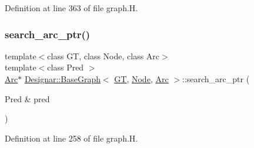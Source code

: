Definition at line 363 of file graph.\+H.

\mbox{\label{class_designar_1_1_base_graph_afcbc602350567bc5a377fd7fc94419ae}} 
\subsubsection{\texorpdfstring{search\+\_\+arc\+\_\+ptr()}{search\_arc\_ptr()}\hspace{0.1cm}{\footnotesize\ttfamily [1/2]}}
{\footnotesize\ttfamily template$<$class GT, class Node, class Arc$>$ \\
template$<$class Pred $>$ \\
\hyperlink{namespace_designar_a3f55fb5513d62ff47cbc8f72b8e95d6f}{Arc}$\ast$ \hyperlink{class_designar_1_1_base_graph}{Designar\+::\+Base\+Graph}$<$ \hyperlink{demo-buildgraph_8_c_a3001c40d2c31ca87ed96cd7d1334a55e}{GT}, \hyperlink{namespace_designar_a5af326c65aa2bd26b26c410f2030d09e}{Node}, \hyperlink{namespace_designar_a3f55fb5513d62ff47cbc8f72b8e95d6f}{Arc} $>$\+::search\+\_\+arc\+\_\+ptr (\begin{DoxyParamCaption}\item[{Pred \&}]{pred }\end{DoxyParamCaption})\hspace{0.3cm}{\ttfamily [inline]}}



Definition at line 258 of file graph.\+H.

\mbox{\label{class_designar_1_1_base_graph_a4ffe61f2548a892d070aa46609c4532c}} 
